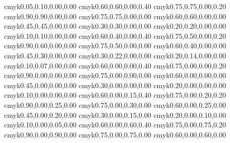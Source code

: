 \definecolor{verypaleviolet}      {cmyk}{0.05,0.10,0.00,0.00}
\definecolor{verydeepblue}        {cmyk}{0.60,0.60,0.00,0.40}
\definecolor{deepblue}            {cmyk}{0.75,0.75,0.00,0.20}
\definecolor{verydarkblue}        {cmyk}{0.90,0.90,0.00,0.00}
\definecolor{darkblue}            {cmyk}{0.75,0.75,0.00,0.00}
\definecolor{blue}                {cmyk}{0.60,0.60,0.00,0.00}
\definecolor{lightblue}           {cmyk}{0.45,0.45,0.00,0.00}
\definecolor{verylightblue}       {cmyk}{0.30,0.30,0.00,0.00}
\definecolor{paleblue}            {cmyk}{0.20,0.20,0.00,0.00}
\definecolor{verypaleblue}        {cmyk}{0.10,0.10,0.00,0.00}
\definecolor{verydeepskyblue}     {cmyk}{0.60,0.40,0.00,0.40}
\definecolor{deepskyblue}         {cmyk}{0.75,0.50,0.00,0.20}
\definecolor{verydarkskyblue}     {cmyk}{0.90,0.60,0.00,0.00}
\definecolor{darkskyblue}         {cmyk}{0.75,0.50,0.00,0.00}
\definecolor{skyblue}             {cmyk}{0.60,0.40,0.00,0.00}
\definecolor{lightskyblue}        {cmyk}{0.45,0.30,0.00,0.00}
\definecolor{verylightskyblue}    {cmyk}{0.30,0.22,0.00,0.00}
\definecolor{paleskyblue}         {cmyk}{0.20,0.14,0.00,0.00}
\definecolor{verypaleskyblue}     {cmyk}{0.10,0.07,0.00,0.00}
\definecolor{verydeepcyan}        {cmyk}{0.60,0.00,0.00,0.40}
\definecolor{deepcyan}            {cmyk}{0.75,0.00,0.00,0.20}
\definecolor{verydarkcyan}        {cmyk}{0.90,0.00,0.00,0.00}
\definecolor{darkcyan}            {cmyk}{0.75,0.00,0.00,0.00}
\definecolor{cyan}                {cmyk}{0.60,0.00,0.00,0.00}
\definecolor{lightcyan}           {cmyk}{0.45,0.00,0.00,0.00}
\definecolor{verylightcyan}       {cmyk}{0.30,0.00,0.00,0.00}
\definecolor{palecyan}            {cmyk}{0.20,0.00,0.00,0.00}
\definecolor{verypalecyan}        {cmyk}{0.10,0.00,0.00,0.00}
\definecolor{verydeepseagreen}    {cmyk}{0.60,0.00,0.15,0.40}
\definecolor{deepseagreen}        {cmyk}{0.75,0.00,0.20,0.20}
\definecolor{verydarkseagreen}    {cmyk}{0.90,0.00,0.25,0.00}
\definecolor{darkseagreen}        {cmyk}{0.75,0.00,0.30,0.00}
\definecolor{seagreen}            {cmyk}{0.60,0.00,0.25,0.00}
\definecolor{lightseagreen}       {cmyk}{0.45,0.00,0.20,0.00}
\definecolor{verylightseagreen}   {cmyk}{0.30,0.00,0.15,0.00}
\definecolor{paleseagreen}        {cmyk}{0.20,0.00,0.10,0.00}
\definecolor{verypaleseagreen}    {cmyk}{0.10,0.00,0.05,0.00}
\definecolor{verydeepgreen}       {cmyk}{0.60,0.00,0.60,0.40}
\definecolor{deepgreen}           {cmyk}{0.75,0.00,0.75,0.20}
\definecolor{verydarkgreen}       {cmyk}{0.90,0.00,0.90,0.00}
\definecolor{darkgreen}           {cmyk}{0.75,0.00,0.75,0.00}
\definecolor{green}               {cmyk}{0.60,0.00,0.60,0.00}
